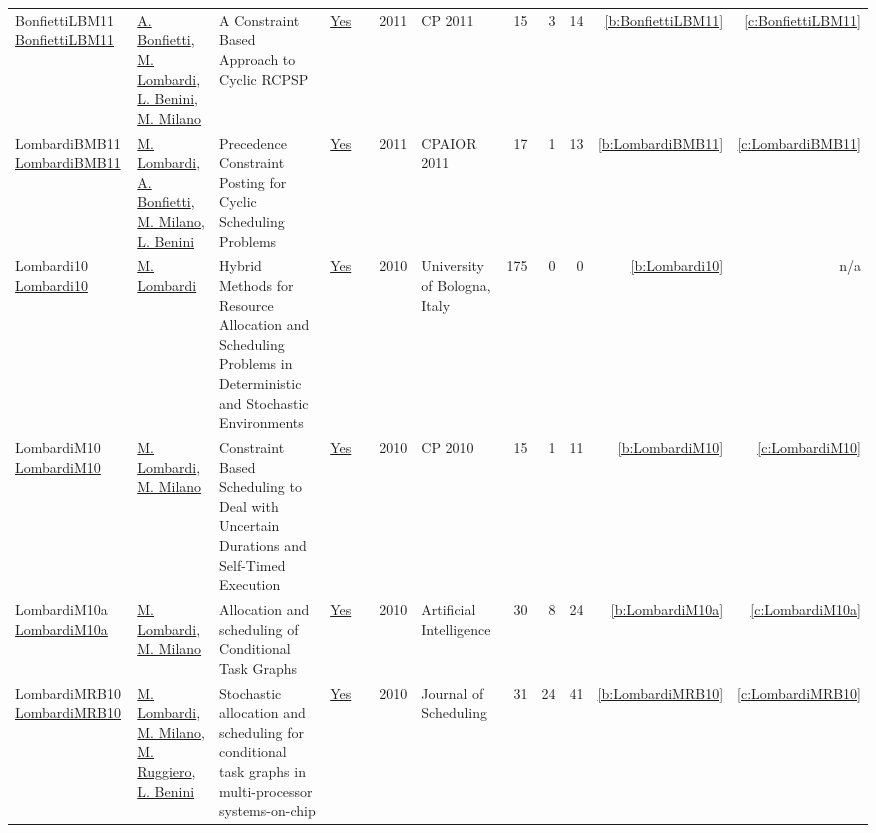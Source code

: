 {\begin{longtable}{>{\raggedright\arraybackslash}p{3cm}>{\raggedright\arraybackslash}p{6cm}>{\raggedright\arraybackslash}p{6.5cm}rrrp{2.5cm}rrrrr}
BonfiettiLBM11 \href{https://doi.org/10.1007/978-3-642-23786-7\_12}{BonfiettiLBM11} & \hyperref[auth:a204]{A. Bonfietti}, \hyperref[auth:a143]{M. Lombardi}, \hyperref[auth:a248]{L. Benini}, \hyperref[auth:a144]{M. Milano} & A Constraint Based Approach to Cyclic {RCPSP} & \href{works/BonfiettiLBM11.pdf}{Yes} & \cite{BonfiettiLBM11} & 2011 & CP 2011 & 15 & 3 & 14 & \ref{b:BonfiettiLBM11} & \ref{c:BonfiettiLBM11}\\
LombardiBMB11 \href{https://doi.org/10.1007/978-3-642-21311-3\_14}{LombardiBMB11} & \hyperref[auth:a143]{M. Lombardi}, \hyperref[auth:a204]{A. Bonfietti}, \hyperref[auth:a144]{M. Milano}, \hyperref[auth:a248]{L. Benini} & Precedence Constraint Posting for Cyclic Scheduling Problems & \href{works/LombardiBMB11.pdf}{Yes} & \cite{LombardiBMB11} & 2011 & CPAIOR 2011 & 17 & 1 & 13 & \ref{b:LombardiBMB11} & \ref{c:LombardiBMB11}\\
Lombardi10 \href{http://amsdottorato.unibo.it/2961/}{Lombardi10} & \hyperref[auth:a143]{M. Lombardi} & Hybrid Methods for Resource Allocation and Scheduling Problems in Deterministic and Stochastic Environments & \href{works/Lombardi10.pdf}{Yes} & \cite{Lombardi10} & 2010 & University of Bologna, Italy & 175 & 0 & 0 & \ref{b:Lombardi10} & n/a\\
LombardiM10 \href{https://doi.org/10.1007/978-3-642-15396-9\_32}{LombardiM10} & \hyperref[auth:a143]{M. Lombardi}, \hyperref[auth:a144]{M. Milano} & Constraint Based Scheduling to Deal with Uncertain Durations and Self-Timed Execution & \href{works/LombardiM10.pdf}{Yes} & \cite{LombardiM10} & 2010 & CP 2010 & 15 & 1 & 11 & \ref{b:LombardiM10} & \ref{c:LombardiM10}\\
LombardiM10a \href{https://doi.org/10.1016/j.artint.2010.02.004}{LombardiM10a} & \hyperref[auth:a143]{M. Lombardi}, \hyperref[auth:a144]{M. Milano} & Allocation and scheduling of Conditional Task Graphs & \href{works/LombardiM10a.pdf}{Yes} & \cite{LombardiM10a} & 2010 & Artificial Intelligence & 30 & 8 & 24 & \ref{b:LombardiM10a} & \ref{c:LombardiM10a}\\
LombardiMRB10 \href{http://dx.doi.org/10.1007/s10951-010-0184-y}{LombardiMRB10} & \hyperref[auth:a143]{M. Lombardi}, \hyperref[auth:a144]{M. Milano}, \hyperref[auth:a727]{M. Ruggiero}, \hyperref[auth:a248]{L. Benini} & Stochastic allocation and scheduling for conditional task graphs in multi-processor systems-on-chip & \href{works/LombardiMRB10.pdf}{Yes} & \cite{LombardiMRB10} & 2010 & Journal of Scheduling & 31 & 24 & 41 & \ref{b:LombardiMRB10} & \ref{c:LombardiMRB10}\\

\end{longtable}}
